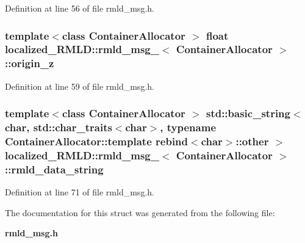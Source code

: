 Definition at line 56 of file rmld\_\-msg.h.

\subsubsection[{origin\_\-z}]{\setlength{\rightskip}{0pt plus 5cm}template$<$class ContainerAllocator $>$ float {\bf localized\_\-RMLD::rmld\_\-msg\_\-}$<$ ContainerAllocator $>$::{\bf origin\_\-z}}\label{structlocalized__RMLD_1_1rmld__msg___afe88b32084f44a2ffe865221b0494aee}


Definition at line 59 of file rmld\_\-msg.h.

\subsubsection[{rmld\_\-data\_\-string}]{\setlength{\rightskip}{0pt plus 5cm}template$<$class ContainerAllocator $>$ std::basic\_\-string$<$char, std::char\_\-traits$<$char$>$, typename ContainerAllocator::template rebind$<$char$>$::other $>$ {\bf localized\_\-RMLD::rmld\_\-msg\_\-}$<$ ContainerAllocator $>$::{\bf rmld\_\-data\_\-string}}\label{structlocalized__RMLD_1_1rmld__msg___a7b5784009680d482821b5c22d6916c66}


Definition at line 71 of file rmld\_\-msg.h.



The documentation for this struct was generated from the following file:\begin{DoxyCompactItemize}
\item 
{\bf rmld\_\-msg.h}\end{DoxyCompactItemize}
